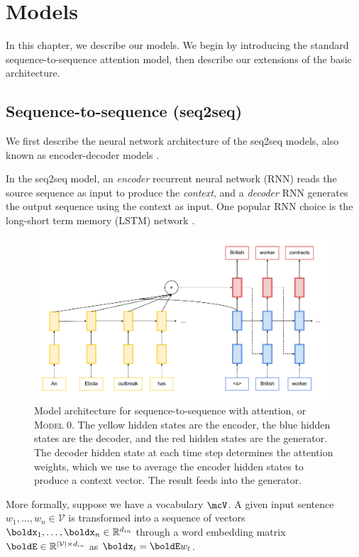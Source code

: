 \documentclass[12pt]{report}
\begin{document}
\chapter{Models}
\label{chap:models}

In this chapter, we describe our models. We begin by introducing the standard sequence-to-sequence attention model, then describe our extensions of the basic architecture.

\section{Sequence-to-sequence (seq2seq)}

We first describe the neural network architecture of the seq2seq models, also known as encoder-decoder models \citep{bahdanau2014neural}.


In the seq2seq model, an \emph{encoder} recurrent neural network (RNN) reads the source sequence as input to produce the \emph{context}, and a \emph{decoder} RNN generates the output sequence using the context as input.  One popular RNN choice is the long-short term memory (LSTM) network \citep{hochreiter1997long}.

\begin{figure}[t]
\includegraphics[width=\textwidth]{images/seq2seq}
\caption[Sequence-to-Sequence Model]{Model architecture for sequence-to-sequence with attention, or \textsc{Model 0}. The yellow hidden states are the encoder, the blue hidden states are the decoder, and the red hidden states are the generator. The decoder hidden state at each time step determines the attention weights, which we use to average the encoder hidden states to produce a context vector. The result feeds into the generator.}
\label{fig:seq2seq}
\end{figure}


More formally, suppose we have a vocabulary $\mcV$. A given input sentence $w_1, \ldots, w_n \in \mathcal{V}$ is transformed into a sequence of vectors $\boldx_1, \ldots, \boldx_n \in \mathbb{R}^{d_{in}}$ through a word embedding matrix $\boldE \in \mathbb{R}^{|\mathcal{V}| \times d_{in}}$ as $\boldx_t = \boldE w_t$.
\end{document}
